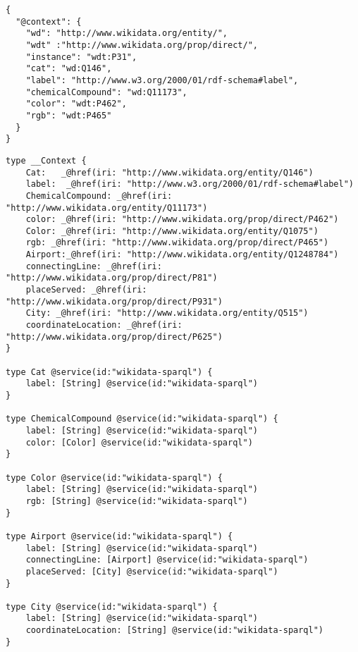 \begin{minipage}{\linewidth}
\begin{lstlisting}[label=listing:listing34, caption={JSON-LD Context}]
{
  "@context": {
    "wd": "http://www.wikidata.org/entity/",
    "wdt" :"http://www.wikidata.org/prop/direct/",
    "instance": "wdt:P31",
    "cat": "wd:Q146",
    "label": "http://www.w3.org/2000/01/rdf-schema#label",
    "chemicalCompound": "wd:Q11173",
    "color": "wdt:P462",
    "rgb": "wdt:P465"
  }
}
\end{lstlisting}
\end{minipage}


\begin{minipage}{\linewidth}
\begin{lstlisting}[label=listing:listing34, caption={HyperGraphQL Annotated Scehma}]
type __Context {
    Cat:   _@href(iri: "http://www.wikidata.org/entity/Q146")
    label:  _@href(iri: "http://www.w3.org/2000/01/rdf-schema#label")
    ChemicalCompound: _@href(iri: "http://www.wikidata.org/entity/Q11173")
    color: _@href(iri: "http://www.wikidata.org/prop/direct/P462")
    Color: _@href(iri: "http://www.wikidata.org/entity/Q1075")
    rgb: _@href(iri: "http://www.wikidata.org/prop/direct/P465")
    Airport:_@href(iri: "http://www.wikidata.org/entity/Q1248784")
    connectingLine: _@href(iri: "http://www.wikidata.org/prop/direct/P81")
    placeServed: _@href(iri: "http://www.wikidata.org/prop/direct/P931")
    City: _@href(iri: "http://www.wikidata.org/entity/Q515")
    coordinateLocation: _@href(iri: "http://www.wikidata.org/prop/direct/P625")
}

type Cat @service(id:"wikidata-sparql") {
    label: [String] @service(id:"wikidata-sparql")
}

type ChemicalCompound @service(id:"wikidata-sparql") {
    label: [String] @service(id:"wikidata-sparql")
    color: [Color] @service(id:"wikidata-sparql")
}

type Color @service(id:"wikidata-sparql") {
    label: [String] @service(id:"wikidata-sparql")
    rgb: [String] @service(id:"wikidata-sparql")
}

type Airport @service(id:"wikidata-sparql") {
    label: [String] @service(id:"wikidata-sparql")
    connectingLine: [Airport] @service(id:"wikidata-sparql")
    placeServed: [City] @service(id:"wikidata-sparql")
}

type City @service(id:"wikidata-sparql") {
    label: [String] @service(id:"wikidata-sparql")
    coordinateLocation: [String] @service(id:"wikidata-sparql")
}
\end{lstlisting}
\end{minipage}

